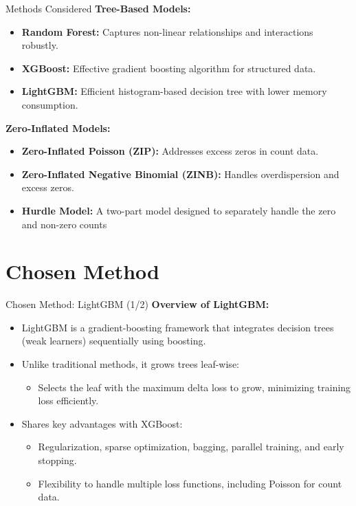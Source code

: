 \documentclass{beamer}\usepackage[]{graphicx}\usepackage[]{xcolor}
\begin{document}
\begin{frame}{Methods Considered}
\textbf{Tree-Based Models:}
\begin{itemize}
    \item \textbf{Random Forest:} Captures non-linear relationships and interactions robustly.
    \item \textbf{XGBoost:} Effective gradient boosting algorithm for structured data.
    \item \textbf{LightGBM:} Efficient histogram-based decision tree with lower memory consumption.
\end{itemize}

\textbf{Zero-Inflated Models:}
\begin{itemize}
    \item \textbf{Zero-Inflated Poisson (ZIP):} Addresses excess zeros in count data.
    \item \textbf{Zero-Inflated Negative Binomial (ZINB):} Handles overdispersion and excess zeros.
    \item \textbf{Hurdle Model:} A two-part model designed to separately handle the zero and non-zero counts
\end{itemize}
\end{frame}

\section{Chosen Method}

\begin{frame}{Chosen Method: LightGBM (1/2)}
\textbf{Overview of LightGBM:}
\begin{itemize}
    \item LightGBM is a gradient-boosting framework that integrates decision trees (weak learners) sequentially using boosting.
    \item Unlike traditional methods, it grows trees leaf-wise:
    \begin{itemize}
        \item Selects the leaf with the maximum delta loss to grow, minimizing training loss efficiently.
    \end{itemize}
    \item Shares key advantages with XGBoost:
    \begin{itemize}
        \item Regularization, sparse optimization, bagging, parallel training, and early stopping.
        \item Flexibility to handle multiple loss functions, including Poisson for count data.
    \end{itemize}
\end{itemize}
\end{frame}
\end{document}
